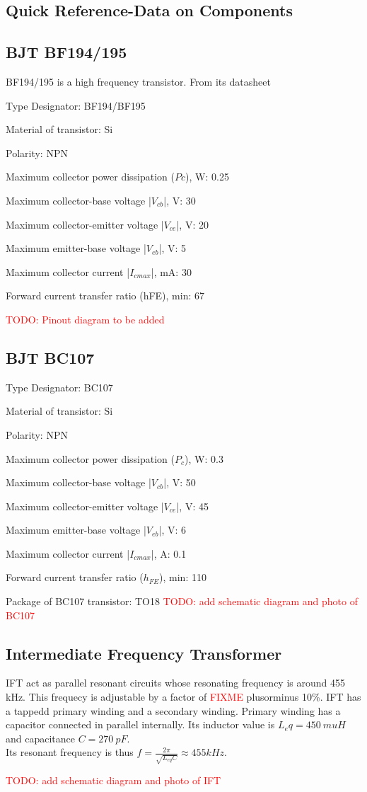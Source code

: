 \documentclass{book}
\begin{document}
\begin{appendix}
\chapter {Quick Reference-Data on Components}
\section{BJT BF194/195}
\label{BF194/195}
BF194/195 is a high frequency transistor. From its datasheet 

Type Designator: BF194/BF195

Material of transistor: Si

Polarity: NPN

Maximum collector power dissipation ($Pc$), W: 0.25

Maximum collector-base voltage |$V_{cb}$|, V: 30

Maximum collector-emitter voltage |$V_{ce}$|, V: 20

Maximum emitter-base voltage |$V_{eb}$|, V: 5

Maximum collector current |$I_{c max}$|, mA: 30

Forward current transfer ratio (hFE), min: 67

\textcolor{red}{TODO: Pinout diagram to be added}
\section{BJT BC107}
\label{BC107}
Type Designator: BC107

Material of transistor: Si

Polarity: NPN

Maximum collector power dissipation ($P_c$), W: 0.3

Maximum collector-base voltage |$V_{cb}$|, V: 50

Maximum collector-emitter voltage |$V_{ce}$|, V: 45

Maximum emitter-base voltage |$V_{eb}$|, V: 6

Maximum collector current |$I_{cmax}$|, A: 0.1

Forward current transfer ratio ($h_{FE}$), min: 110

Package of BC107 transistor: TO18
\textcolor{red}{TODO: add schematic diagram and photo of BC107}

\section{Intermediate Frequency Transformer}
\label{IFT}
IFT act as parallel resonant circuits whose resonating frequency is around 455 kHz. This frequecy is adjustable by a factor of  \textcolor{red}{FIXME} plusorminus 10\%. IFT has a tappedd primary winding and a secondary winding. Primary winding has a capacitor connected in parallel internally. Its inductor value is $L_eq=450\ mu H$ and capacitance $C=270\ pF$. 
\\Its resonant frequency is thus $f=\frac{2\pi}{\sqrt{L_{eq}C}}\approx 455 kHz$.

\textcolor{red}{TODO: add schematic diagram and photo of IFT}
\end{appendix}
\begin{thebibliography}{1}

\end{thebibliography}
\end{document}
